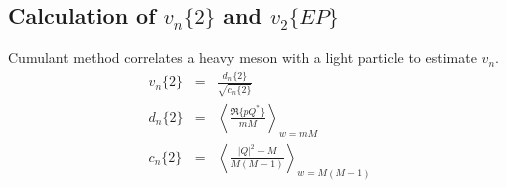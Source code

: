 \documentclass[aps, prc, reprint, amsmath, groupedaddress, nofootinbib]{revtex4-1}
\begin{document}
\begin{appendices}
\section{Calculation of $v_n\{2\}$ and $v_2\{EP\}$}
Cumulant method correlates a heavy meson with a light particle to estimate $v_n$. 
\begin{eqnarray}
v_n\{2\} &=& \frac{d_n\{2\}}{\sqrt{c_n\{2\}} } \\
d_n\{2\} &=& \left\langle \frac{\Re\{pQ^*\}}{mM} \right\rangle_{w = mM} \\
c_n\{2\} &=& \left\langle \frac{|Q|^2-M}{M(M-1)} \right\rangle_{w = M(M-1)}
\end{eqnarray}
\end{appendices}
\end{document}
